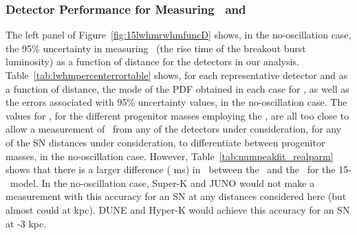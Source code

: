 \subsubsection{Detector Performance for Measuring \trise\ and \tfall}
The left panel of Figure~\ref{fig:15lwhmrwhmfuncD} shows, in the no-oscillation case,
the  95\% uncertainty in
measuring \trise\ (the rise time of the breakout burst luminosity) as
a function of distance for the detectors in our analysis. 
Table~\ref{tab:lwhmpercenterrortable} shows, for each representative
detector and as a function of distance, the mode of the PDF obtained
in each case for \trise, as well as the 
errors associated with 95\% uncertainty values, in the no-oscillation case.
The values for \trise, for the different progenitor masses employing the
\ls, are all too close to allow a measurement of \trise\ from
any of the detectors under consideration, for any of the SN
distances under consideration, to differentiate between progenitor
masses, in the no-oscillation case.  
However, Table~\ref{tab:numpeakfit_realparm} shows that there
is a larger difference ( ms) in \trise\ between the \ls\ and the \shen\ for
the 15-\Msol\ model.  In the no-oscillation case, 
Super-K and JUNO would not make a measurement with this
accuracy for an SN at any distances considered here (but 
almost could at  kpc). DUNE and Hyper-K would achieve this
accuracy for an SN at -3 kpc.

